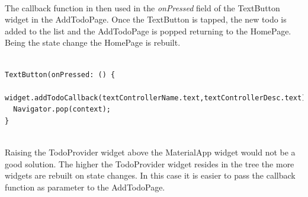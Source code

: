 \mbox{}\\
The callback function in then used in the \textit{onPressed} field of the TextButton widget in the AddTodoPage. Once the TextButton is tapped, the new todo is added to the list and the AddTodoPage is popped returning to the HomePage. Being the state change the HomePage is rebuilt.
\mbox{}\\
\mbox{}
\begin{code}
\label{code:2.36}
\begin{verbatim}

TextButton(onPressed: () {
  widget.addTodoCallback(textControllerName.text,textControllerDesc.text);
  Navigator.pop(context);
}
\end{verbatim}
\end{code}
\mbox{}\\
Raising the TodoProvider widget above the MaterialApp widget would not be a good solution. The higher the TodoProvider widget resides in the tree the more widgets are rebuilt on state changes. In this case it is easier to pass the callback function as parameter to the AddTodoPage.


